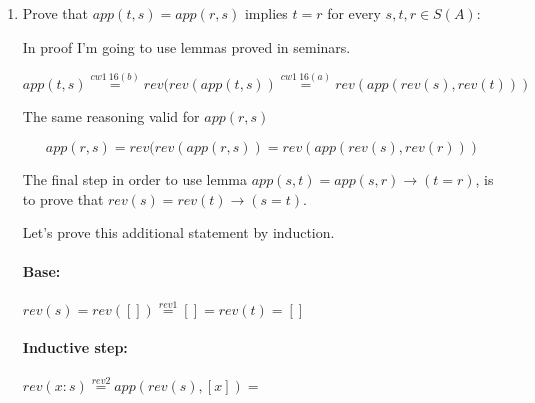 \documentclass{article}
\begin{document}
\begin{enumerate}
\begin{enumerate}
\end{enumerate}
\newpage

\item Prove that $app(t, s) = app(r, s)$ implies $t = r$ for every $s, t, r \in S(A)$:

In proof I'm going to use lemmas proved in seminars.

\[app(t, s) \stackrel{cw1 \: 16(b)}{=} rev(rev(app(t, s)) \stackrel{cw1 \: 16(a)}{=} rev(app(rev(s), rev(t)))\]

The same reasoning valid for $app(r, s)$

\[app(r, s) = rev(rev(app(r, s)) = rev(app(rev(s), rev(r)))\]

The final step in order to use lemma $app(s, t) = app(s, r) \to (t = r)$, is to prove that $rev(s) = rev(t) \to (s = t)$.

Let's prove this additional statement by induction.

\paragraph{Base:} $rev(s) = rev([]) \stackrel{rev1}{=} [] = rev(t) = []$
\paragraph{Inductive step:} $rev(x : s) \stackrel{rev2}{=} app(rev(s), [x]) = $

\end{enumerate}
\end{document}
